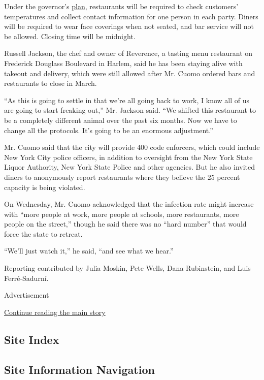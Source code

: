 Under the governor's
\href{https://forward.ny.gov/nyc-indoor-dining}{plan}, restaurants will
be required to check customers' temperatures and collect contact
information for one person in each party. Diners will be required to
wear face coverings when not seated, and bar service will not be
allowed. Closing time will be midnight.

Russell Jackson, the chef and owner of Reverence, a tasting menu
restaurant on Frederick Douglass Boulevard in Harlem, said he has been
staying alive with takeout and delivery, which were still allowed after
Mr. Cuomo ordered bars and restaurants to close in March.

``As this is going to settle in that we're all going back to work, I
know all of us are going to start freaking out,'' Mr. Jackson said. ``We
shifted this restaurant to be a completely different animal over the
past six months. Now we have to change all the protocols. It's going to
be an enormous adjustment.''

Mr. Cuomo said that the city will provide 400 code enforcers, which
could include New York City police officers, in addition to oversight
from the New York State Liquor Authority, New York State Police and
other agencies. But he also invited diners to anonymously report
restaurants where they believe the 25 percent capacity is being
violated.

On Wednesday, Mr. Cuomo acknowledged that the infection rate might
increase with ``more people at work, more people at schools, more
restaurants, more people on the street,'' though he said there was no
``hard number'' that would force the state to retreat.

``We'll just watch it,'' he said, ``and see what we hear.''

Reporting contributed by Julia Moskin, Pete Wells, Dana Rubinstein, and
Luis Ferré-Sadurní.

Advertisement

\protect\hyperlink{after-bottom}{Continue reading the main story}

\hypertarget{site-index}{%
\subsection{Site Index}\label{site-index}}

\hypertarget{site-information-navigation}{%
\subsection{Site Information
Navigation}\label{site-information-navigation}}

